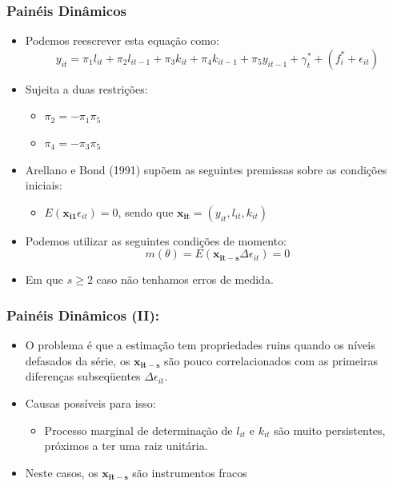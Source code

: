 \documentclass{beamer}
\begin{document}
\begin{frame}\frametitle{Painéis Dinâmicos}

\begin{itemize}
\item Podemos reescrever esta equação como:
\[
y_{it}=\pi_{1}l_{it}+\pi_{2}l_{it-1}+\pi_{3}k_{it}+\pi_{4}k_{it-1}+\pi_{5}y_{it-1}+\gamma_{t}^{*}+(f_{i}^{*}+\epsilon_{it})
\]
\item Sujeita a duas restrições:

\begin{itemize}
\item $\pi_{2}=-\pi_{1}\pi_{5}$
\item $\pi_{4}=-\pi_{3}\pi_{5}$
\end{itemize}
\item Arellano e Bond (1991) supõem as seguintes premissas sobre as condições
iniciais:

\begin{itemize}
\item $E(\mathbf{x_{i1}}\epsilon_{it})=0$, sendo que $\mathbf{x_{it}}=(y_{it},l_{it},k_{it})$
\end{itemize}
\item Podemos utilizar as seguintes condições de momento:
\[
m(\theta)=E(\mathbf{x_{it-s}}\Delta\epsilon_{it})=0
\]
\item Em que $s\geq2$ caso não tenhamos erros de medida.
\end{itemize}
\end{frame}

\begin{frame}\frametitle{Painéis Dinâmicos (II):}

\begin{itemize}
\item O problema é que a estimação tem propriedades ruins quando os níveis
defasados da série, os $\mathbf{x_{it-s}}$ são pouco correlacionados
com as primeiras diferenças subseqüentes $\Delta\epsilon_{it}$.
\item Causas possíveis para isso:

\begin{itemize}
\item Processo marginal de determinação de $l_{it}$ e $k_{it}$ são muito
persistentes, próximos a ter uma raiz unitária.
\end{itemize}
\item Neste casos, os $\mathbf{x_{it-s}}$ são instrumentos fracos
\end{itemize}
\end{frame}
\end{document}
